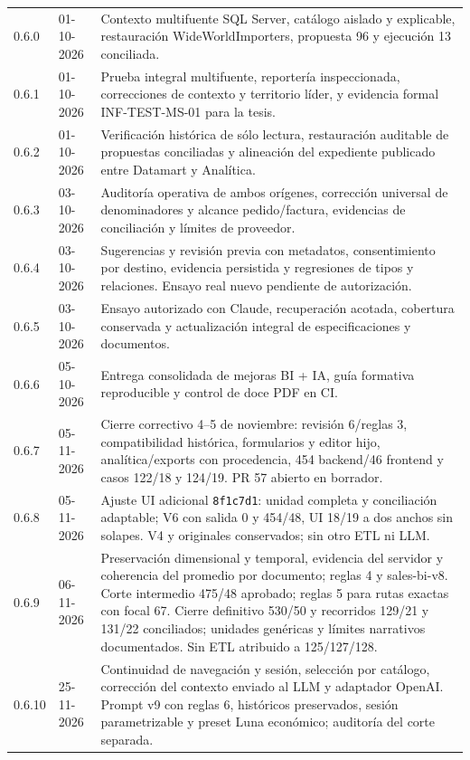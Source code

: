 \documentclass[11pt,letterpaper]{article}
\newcommand{\file}[1]{\texttt{#1}}
\begin{document}
\begin{longtable}{@{}p{0.82in}@{\hspace{0.16in}}p{0.98in}@{\hspace{0.16in}}p{4.36in}@{}}
  0.6.0 & 01-10-2026 & Contexto multifuente SQL Server, catálogo aislado y explicable, restauración WideWorldImporters, propuesta 96 y ejecución 13 conciliada. \\
  0.6.1 & 01-10-2026 & Prueba integral multifuente, reportería inspeccionada, correcciones de contexto y territorio líder, y evidencia formal INF-TEST-MS-01 para la tesis. \\
  0.6.2 & 01-10-2026 & Verificación histórica de sólo lectura, restauración auditable de propuestas conciliadas y alineación del expediente publicado entre Datamart y Analítica. \\
  0.6.3 & 03-10-2026 & Auditoría operativa de ambos orígenes, corrección universal de denominadores y alcance pedido/factura, evidencias de conciliación y límites de proveedor. \\
  0.6.4 & 03-10-2026 & Sugerencias y revisión previa con metadatos, consentimiento por destino, evidencia persistida y regresiones de tipos y relaciones. Ensayo real nuevo pendiente de autorización. \\
  0.6.5 & 03-10-2026 & Ensayo autorizado con Claude, recuperación acotada, cobertura conservada y actualización integral de especificaciones y documentos. \\
  0.6.6 & 05-10-2026 & Entrega consolidada de mejoras BI + IA, guía formativa reproducible y control de doce PDF en CI. \\
  0.6.7 & 05-11-2026 & Cierre correctivo 4--5 de noviembre: revisión 6/reglas 3, compatibilidad histórica, formularios y editor hijo, analítica/exports con procedencia, 454 backend/46 frontend y casos 122/18 y 124/19. PR 57 abierto en borrador. \\
  0.6.8 & 05-11-2026 & Ajuste UI adicional \file{8f1c7d1}: unidad completa y conciliación adaptable; V6 con salida 0 y 454/48, UI 18/19 a dos anchos sin solapes. V4 y originales conservados; sin otro ETL ni LLM. \\
  0.6.9 & 06-11-2026 & Preservación dimensional y temporal, evidencia del servidor y coherencia del promedio por documento; reglas 4 y sales-bi-v8. Corte intermedio 475/48 aprobado; reglas 5 para rutas exactas con focal 67. Cierre definitivo 530/50 y recorridos 129/21 y 131/22 conciliados; unidades genéricas y límites narrativos documentados. Sin ETL atribuido a 125/127/128. \\
  0.6.10 & 25-11-2026 & Continuidad de navegación y sesión, selección por catálogo, corrección del contexto enviado al LLM y adaptador OpenAI. Prompt v9 con reglas 6, históricos preservados, sesión parametrizable y preset Luna económico; auditoría del corte separada. \\
  \bottomrule
\end{longtable}
\end{document}

